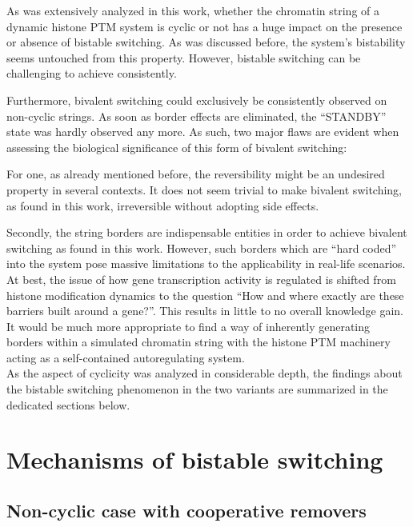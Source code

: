             As was extensively analyzed in this work, whether the chromatin string of a dynamic histone PTM system is cyclic or not has a huge impact on the presence or absence of bistable switching. As was discussed before, the system's bistability seems untouched from this property. However, bistable switching can be challenging to achieve consistently.

            Furthermore, bivalent switching could exclusively be consistently observed on non-cyclic strings. As soon as border effects are eliminated, the “STANDBY” state was hardly observed any more. As such, two major flaws are evident when assessing the biological significance of this form of bivalent switching:

            For one, as already mentioned before, the reversibility might be an undesired property in several contexts. It does not seem trivial to make bivalent switching, as found in this work, irreversible without adopting side effects.

            Secondly, the string borders are indispensable entities in order to achieve bivalent switching as found in this work. However, such borders which are “hard coded” into the system pose massive limitations to the applicability in real-life scenarios. At best, the issue of how gene transcription activity is regulated is shifted from histone modification dynamics to the question “How and where exactly are these barriers built around a gene?”. This results in little to no overall knowledge gain. It would be much more appropriate to find a way of inherently generating borders within a simulated chromatin string with the histone PTM machinery acting as a self-contained autoregulating system.\\

            As the aspect of cyclicity was analyzed in considerable depth, the findings about the bistable switching phenomenon in the two variants are summarized in the dedicated sections below.
    \section{Mechanisms of bistable switching}

        \subsection{Non-cyclic case with cooperative removers}

